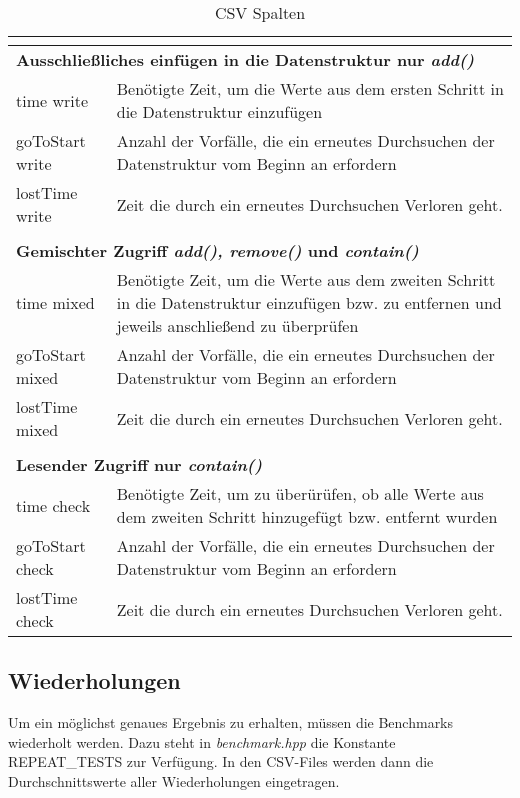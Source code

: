 \begin{table}[H]
\begin{tabular}{ |m{2.5cm}|  m{13cm}| }
	 \multicolumn{2}{l}{} \\ \hline
	 \multicolumn{2}{|l|}{\textbf{Ausschließliches einfügen in die Datenstruktur nur \textit{add()}}}    \\ \hline
	 time write& 	Benötigte Zeit, um die Werte aus dem ersten Schritt in die Datenstruktur einzufügen\\ \hline
	 goToStart write& Anzahl der Vorfälle, die ein erneutes Durchsuchen der Datenstruktur vom Beginn an erfordern\\ \hline
	 lostTime write&  Zeit die durch ein erneutes Durchsuchen Verloren geht.\\ \hline
	 \multicolumn{2}{l}{} \\ \hline
	 \multicolumn{2}{|l|}{\textbf{Gemischter Zugriff \textit{add(), remove()} und \textit{contain()}}}    \\ \hline
	 time mixed& 	Benötigte Zeit, um die Werte aus dem zweiten Schritt in die Datenstruktur einzufügen 
	 				bzw. zu entfernen und jeweils anschließend zu überprüfen\\ \hline
	 goToStart mixed& Anzahl der Vorfälle, die ein erneutes Durchsuchen der Datenstruktur vom Beginn an erfordern\\ \hline
	 lostTime mixed& Zeit die durch ein erneutes Durchsuchen Verloren geht.\\ \hline
	 \multicolumn{2}{l}{} \\ \hline
	 \multicolumn{2}{|l|}{\textbf{Lesender Zugriff nur \textit{contain()}}}    \\ \hline
	 time check& Benötigte Zeit, um zu überürüfen, ob alle Werte aus dem zweiten Schritt hinzugefügt bzw. entfernt wurden \\ \hline
	 goToStart check& Anzahl der Vorfälle, die ein erneutes Durchsuchen der Datenstruktur vom Beginn an erfordern\\ \hline
	 lostTime check& Zeit die durch ein erneutes Durchsuchen Verloren geht.\\ \hline
	\end{tabular} 
	\caption{CSV Spalten}
	\label{tab:csv}
	\end{table}

\subsection{Wiederholungen}
Um ein möglichst genaues Ergebnis zu erhalten, müssen die Benchmarks wiederholt werden. Dazu steht in \textit{benchmark.hpp}
die Konstante REPEAT\_TESTS zur Verfügung. In den CSV-Files werden dann die Durchschnittswerte aller Wiederholungen eingetragen.